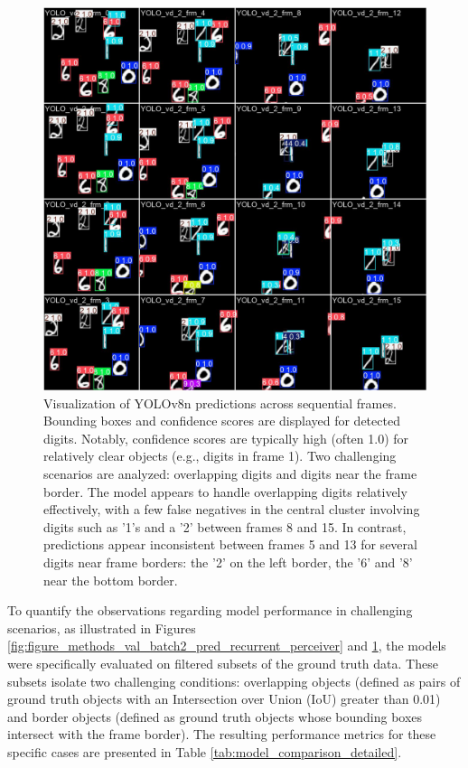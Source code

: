 \begin{figure}
    \centering
    \includegraphics[width=\textwidth]{figures/figure_methods_val_batch2_pred_YOLO.jpg}
    \caption{Visualization of YOLOv8n \cite{Jocher_Ultralytics_YOLO_2023} predictions across sequential frames. Bounding boxes and confidence scores are displayed for detected digits. Notably, confidence scores are typically high (often 1.0) for relatively clear objects (e.g., digits in frame 1). Two challenging scenarios are analyzed: overlapping digits and digits near the frame border. The model appears to handle overlapping digits relatively effectively, with a few false negatives in the central cluster involving digits such as '1's and a '2' between frames 8 and 15. In contrast, predictions appear inconsistent between frames 5 and 13 for several digits near frame borders: the '2' on the left border, the '6' and '8' near the bottom border.}
    \label{fig:figure_methods_val_batch2_pred_YOLO}
\end{figure}


To quantify the observations regarding model performance in challenging scenarios, as illustrated in Figures \ref{fig:figure_methods_val_batch2_pred_recurrent_perceiver} and \ref{fig:figure_methods_val_batch2_pred_YOLO}, the models were specifically evaluated on filtered subsets of the ground truth data. These subsets isolate two challenging conditions: overlapping objects (defined as pairs of ground truth objects with an Intersection over Union (IoU) greater than 0.01) and border objects (defined as ground truth objects whose bounding boxes intersect with the frame border). The resulting performance metrics for these specific cases are presented in Table \ref{tab:model_comparison_detailed}.

